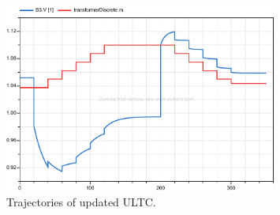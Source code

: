 \documentclass{article}	%
\begin{document}
\begin{figure}[H]
\centering
 \includegraphics[width=0.8\textwidth]{vm}
    \caption{Trajectories of updated ULTC.}
\label{fig:updated}
\end{figure}



\end{document}

